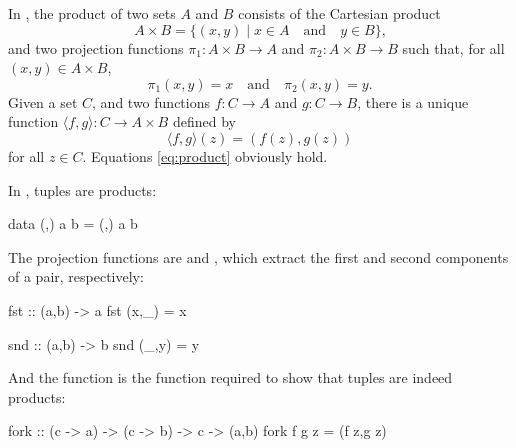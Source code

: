 \begin{example}


  \label{ex:product-set}


  In \set, the product of two sets $A$ and $B$ consists of the
  Cartesian product
  \begin{equation}
    A \times B = \{(x,y) \mid x \in A \quad\text{and}\quad y \in B\}
    \text{,}
  \end{equation}
  and two projection functions $\pi_{1}: A \times B \to A$ and
  $\pi_{2}: A \times B \to B$ such that, for all $(x,y) \in A \times
  B$,
  \begin{equation*}
    \pi_{1}(x,y) = x
    \quad
    \text{and}
    \quad
    \pi_{2}(x,y) = y
    \text{.}
  \end{equation*}
  Given a set $C$, and two functions $f: C \to A$ and $g: C \to B$,
  there is a unique function $\langle{f,g}\rangle: C \to A \times B$
  defined by
  \begin{equation*}
    \langle{f,g}\rangle(z) = (f(z),g(z))
  \end{equation*}
  for all $z \in C$. Equations \eqref{eq:product} obviously hold.

\end{example}

\begin{example}
  \label{ex:product-haskell}

  \index{\hask}


  In \hask, tuples are products:
  \begin{codehaskell}
data (,) a b = (,) a b
  \end{codehaskell}
  The projection functions are  and
  , which extract the first and second components of
  a pair, respectively:
  \begin{codehaskell}
fst :: (a,b) -> a
fst (x,_) = x

snd :: (a,b) -> b
snd (_,y) = y
  \end{codehaskell}
  And the  function is the function required to show
  that tuples are indeed products:
  \begin{codehaskell}
fork :: (c -> a) -> (c -> b) -> c -> (a,b)
fork f g z = (f z,g z)
  \end{codehaskell}

\end{example}

